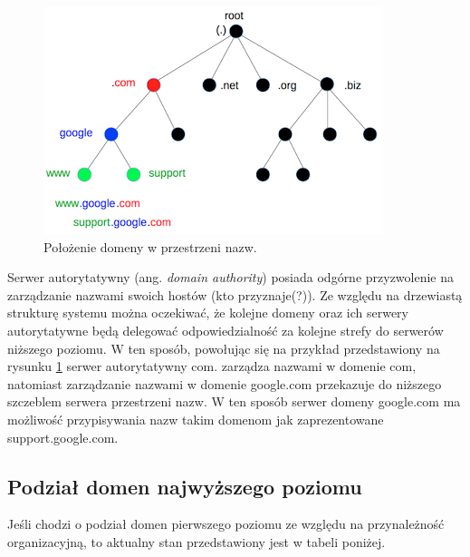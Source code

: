 \begin{center}
	\begin{figure}
	\includegraphics[scale=1]{image/domain_tree}
	\caption{Położenie domeny w przestrzeni nazw. \cite{domain_tree_src}}
	\label{example_domain_tree}
	\end{figure}
\end{center}

Serwer autorytatywny (ang. \textit{domain authority}) posiada odgórne przyzwolenie na zarządzanie nazwami swoich hostów
(kto przyznaje(?)\cite{toDoWarning}). Ze względu na drzewiastą strukturę systemu można oczekiwać, że kolejne domeny oraz ich serwery
autorytatywne będą delegować odpowiedzialność za kolejne strefy do serwerów niższego poziomu. W ten sposób, powołując się na przykład
przedstawiony na rysunku \ref{example_domain_tree} serwer autorytatywny com. zarządza nazwami w domenie com, natomiast zarządzanie
nazwami w domenie google.com przekazuje do niższego szczeblem serwera przestrzeni nazw. W ten sposób serwer domeny google.com ma
możliwość przypisywania nazw takim domenom jak zaprezentowane support.google.com.

\subsection{Podział domen najwyższego poziomu}
Jeśli chodzi o podział domen pierwszego poziomu ze względu na przynależność organizacyjną, to aktualny stan przedstawiony jest w
tabeli poniżej.

